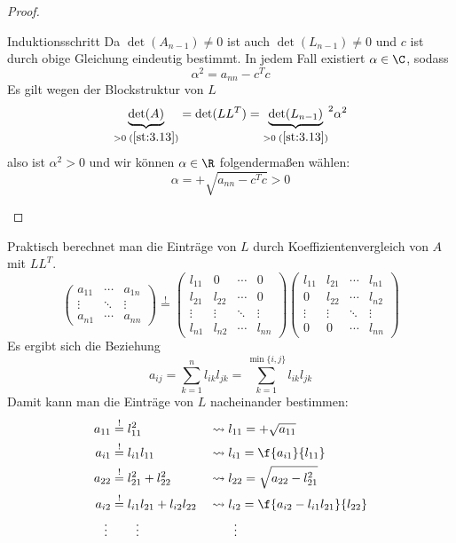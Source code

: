 \documentclass[a4paper]{scrartcl}
\numberwithin{equation}{section}
\begin{document}
\begin{st}
\begin{proof}
\begin{seg}{Induktionsschritt}
		Da $\det (A_{n-1}) \neq 0$ ist auch $\det(L_{n-1})\neq 0$ und $c$ ist durch obige Gleichung eindeutig bestimmt.
		In jedem Fall existiert $\alpha \in \C$, sodass
		\[
			\alpha^2 = a_{nn}-c^Tc
		\]
		Es gilt wegen der Blockstruktur von $L$ 
		\[
			\underbrace{\det (A)}_{>0\; (\ref{st:3.13})} = \det (LL^T) = {\underbrace{\det (L_{n-1})}_{>0\;(\ref{st:3.13})}}^2 \alpha^2
		\]
		also ist $\alpha^2 >0$ und wir können $\alpha \in \R$ folgendermaßen wählen:
		\[
			\alpha = +\sqrt{a_{nn}-c^Tc} > 0
		\]
	\end{seg}
	\end{proof}
\end{st}

Praktisch berechnet man die Einträge von $L$ durch Koeffizientenvergleich von $A$ mit $LL^T$.
\[
	\begin{pmatrix}
		a_{11} & \cdots & a_{1n}\\
		\vdots & \ddots & \vdots \\
		a_{n1} & \cdots & a_{nn}
	\end{pmatrix}
	\stackrel !=
	\begin{pmatrix}
		l_{11} & 0 & \cdots & 0\\
		l_{21} & l_{22} & \cdots & 0\\
		\vdots & \vdots & \ddots & \vdots \\
		l_{n1} & l_{n2} & \cdots & l_{nn}
	\end{pmatrix}
	\begin{pmatrix}
		l_{11} & l_{21} & \cdots & l_{n1}\\
		0 & l_{22} & \cdots & l_{n2}\\
		\vdots & \vdots & \ddots & \vdots \\
		0 & 0 & \cdots & l_{nn}
	\end{pmatrix}
\]
Es ergibt sich die Beziehung
\[
	a_{ij} = \sum_{k=1}^n l_{ik}l_{jk} = \sum_{k=1}^{\min\{i,j\}}l_{ik}l_{jk}
\]
Damit kann man die Einträge von $L$ nacheinander bestimmen:
\begin{alignat*}{2}
	a_{11} &\stackrel != l_{11}^2 &&\leadsto l_{11} = +\sqrt{a_{11}}\\
	a_{i1} &\stackrel != l_{i1}l_{11} &&\leadsto l_{i1} = \f {a_{i1}}{l_{11}}\\
	a_{22} &\stackrel != l_{21}^2 + l_{22}^2 &&\leadsto l_{22} = \sqrt{a_{22}-l_{21}^2}\\
	a_{i2} &\stackrel != l_{i1}l_{21} + l_{i2}l_{22} &&\leadsto l_{i2} = \f {a_{i2}-l_{i1}l_{21}}{l_{22}}\\
	\vdots \; &\qquad \vdots && \qquad \vdots
\end{alignat*}
\end{document}
